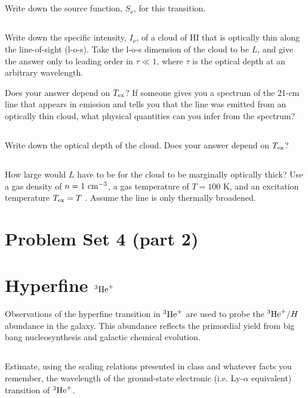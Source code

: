 \documentclass[11pt]{article}
\begin{document}
\subsection{}
Write down the source function, $S_\nu$, for this transition.

\subsection{}
Write down the specific intensity, $I_\nu$, of a cloud of HI that is optically
thin along the line-of-sight (l-o-s). Take the l-o-s dimension of the cloud to
be $L$, and give the answer only to leading order in $\tau\ll1$, where $\tau$ is the
optical depth at an arbitrary wavelength.

Does your answer depend on ${T_{\rm ex}}$?  If someone gives you a spectrum of the 21-cm
line that appears in emission and tells you that the line was emitted from an
optically thin cloud, what physical quantities can you infer from the spectrum?

\subsection{}
Write down the optical depth of the cloud. Does your answer depend on ${T_{\rm ex}}$?

\subsection{} %
How large would $L$ have to be for the cloud to be marginally optically
thick? Use a gas density of $n=1~{\rm cm}^{-3}$, a gas temperature of $T = 100$ K, and an
excitation temperature ${T_{\rm ex}} = T$ . Assume the line is only thermally broadened.

\def\He{{^3{\rm He}^+}}
\section*{\centering Problem Set 4 (part 2)}

\section{Hyperfine $\He$}
Observations of the hyperfine transition in $\He$ are used to probe the $\He/H$ abundance
in the galaxy.  This abundance reflects the primordial yield from big bang nucleosynthesis
and galactic chemical evolution.

\subsection{}
Estimate, using the scaling relations presented in class and whatever facts you
remember, the wavelength of the ground-state electronic (i.e. Ly-$\alpha$ equivalent) transition of $\He$.
\end{document}
